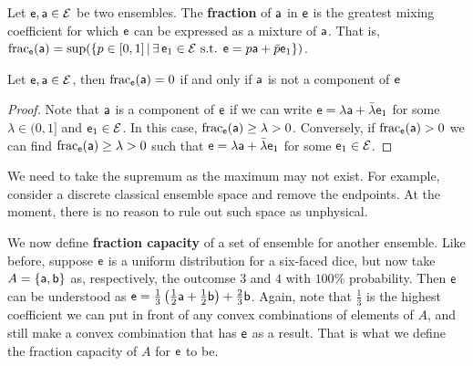 \begin{mathSection}
	\begin{defn}
		Let $\ens, \ens[a] \in \Ens$ be two ensembles. The \textbf{fraction} of $\ens[a]$ in $\ens$ is the greatest mixing coefficient for which $\ens$ can be expressed as a mixture of $\ens[a]$. That is, $\size_{\ens}(\ens[a]) = \sup(\{ p \in [0,1] \, | \, \exists \, \ens_1 \in \Ens \text{ s.t. }  \ens = p \ens[a] + \bar{p} \ens_1 \})$.
	\end{defn}
	
	\begin{coro}
		Let $\ens, \ens[a] \in \Ens$, then $\size_{\ens}(\ens[a]) = 0$ if and only if $\ens[a]$ is not a component of $\ens$
	\end{coro}
	
	\begin{proof}
		Note that $\ens[a]$ is a component of $\ens$ if we can write $\ens = \lambda \ens[a] + \bar{\lambda} \ens_1$ for some $\lambda \in (0,1]$ and $\ens_1 \in \Ens$. In this case, $\size_{\ens}(\ens[a]) \geq \lambda > 0$. Conversely, if $\size_{\ens}(\ens[a]) > 0$ we can find $\size_{\ens}(\ens[a]) \geq \lambda > 0$ such that $\ens = \lambda \ens[a] + \bar{\lambda} \ens_1$ for some $\ens_1 \in \Ens$.
	\end{proof}
	
	\begin{remark}
		We need to take the supremum as the maximum may not exist. For example, consider a discrete classical ensemble space and remove the endpoints. At the moment, there is no reason to rule out such space as unphysical.
	\end{remark}
\end{mathSection}

We now define \textbf{fraction capacity} of a set of ensemble for another ensemble. Like before, suppose $\ens$ is a uniform distribution for a six-faced dice, but now take $A = \{ \ens[a], \ens[b] \}$ as, respectively, the outcomse $3$ and $4$ with $100\%$ probability. Then $\ens$ can be understood as $\ens = \frac{1}{3} \left(\frac{1}{2} \ens[a] + \frac{1}{2} \ens[b] \right) + \frac{2}{3} \ens[b]$. Again, note that $\frac{1}{3}$ is the highest coefficient we can put in front of any convex combinations of elements of $A$, and still make a convex combination that has $\ens$ as a result. That is what we define the fraction capacity of $A$ for $\ens$ to be.

